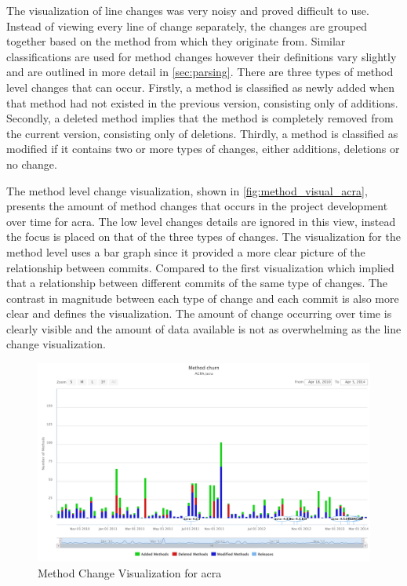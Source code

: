 The visualization of line changes was very noisy and proved difficult to use. Instead of viewing every line of change separately, the changes are grouped together based on the method from which they originate from. Similar classifications are used for method changes however their definitions vary slightly and are outlined in more detail in \autoref{sec:parsing}. There are three types of method level changes that can occur. Firstly, a method is classified as newly added when that method had not existed in the previous version, consisting only of additions. Secondly, a deleted method implies that the method is completely removed from the current version, consisting only of deletions. Thirdly, a method is classified as modified if it contains two or more types of changes, either additions, deletions or no change.

The method level change visualization, shown in \autoref{fig:method_visual_acra}, presents the amount of method changes that occurs in the project development over time for acra. The low level changes details are ignored in this view, instead the focus is placed on that of the three types of changes. The visualization for the method level uses a bar graph since it provided a more clear picture of the relationship between commits. Compared to the first visualization which implied that a relationship between different commits of the same type of changes. The contrast in magnitude between each type of change and each commit is also more clear and defines the visualization. The amount of change occurring over time is clearly visible and the amount of data available is not as overwhelming as the line change visualization.


\begin{landscape}
\thispagestyle{empty}
 \begin{figure}
  \centering
    \includegraphics[width=1.5\textwidth]{images/method_visual_acra}
    \caption{Method Change Visualization for acra}
    \label{fig:method_visual_acra}
 \end{figure}
\end{landscape}
\thispagestyle{plain}

